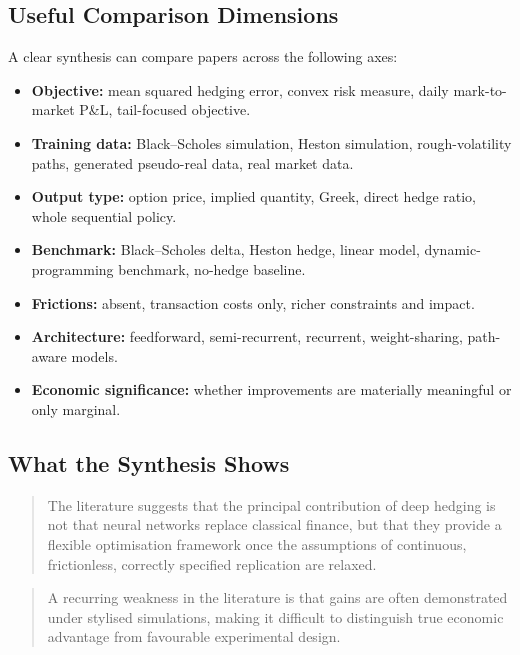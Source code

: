 \documentclass[12pt, a4paper]{article}
\begin{document}
\subsection{Useful Comparison Dimensions}
\label{subsec:comparison}

A clear synthesis can compare papers across the following axes:
\begin{itemize}
    \item \textbf{Objective:} mean squared hedging error, convex risk measure, daily
          mark-to-market P\&L, tail-focused objective.
    \item \textbf{Training data:} Black--Scholes simulation, Heston simulation,
          rough-volatility paths, generated pseudo-real data, real market data.
    \item \textbf{Output type:} option price, implied quantity, Greek, direct hedge
          ratio, whole sequential policy.
    \item \textbf{Benchmark:} Black--Scholes delta, Heston hedge, linear model,
          dynamic-programming benchmark, no-hedge baseline.
    \item \textbf{Frictions:} absent, transaction costs only, richer constraints
          and impact.
    \item \textbf{Architecture:} feedforward, semi-recurrent, recurrent,
          weight-sharing, path-aware models.
    \item \textbf{Economic significance:} whether improvements are materially
          meaningful or only marginal.
\end{itemize}

\subsection{What the Synthesis Shows}
\label{subsec:synthesis_findings}


\begin{quote}
The literature suggests that the principal contribution of deep hedging is not that
neural networks replace classical finance, but that they provide a flexible
optimisation framework once the assumptions of continuous, frictionless, correctly
specified replication are relaxed.
\end{quote}

\begin{quote}
A recurring weakness in the literature is that gains are often demonstrated under
stylised simulations, making it difficult to distinguish true economic advantage from
favourable experimental design.
\end{quote}
\end{document}
